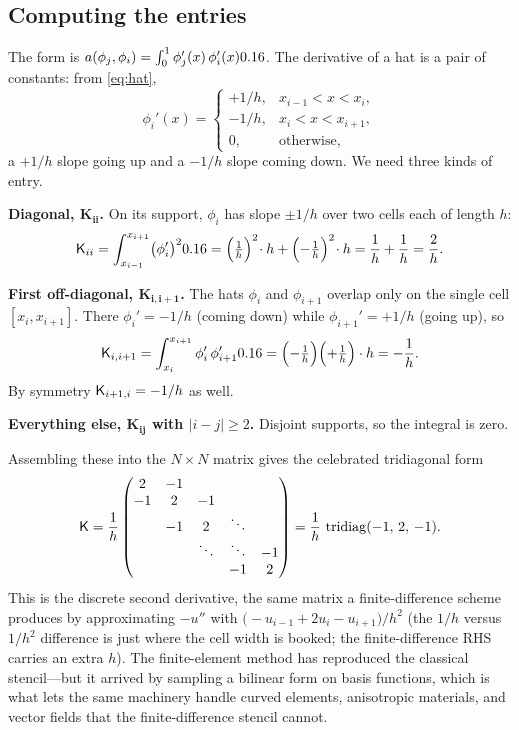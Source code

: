 \subsection{Computing the entries}

The form is $a(\phi_j,\phi_i)=\int_0^1\phi_j'(x)\,\phi_i'(x)0.16$. The derivative
of a hat is a pair of constants: from \cref{eq:hat},
\[
\phi_i'(x)=
\begin{cases}
+1/h, & x_{i-1}<x<x_i,\\
-1/h, & x_i<x<x_{i+1},\\
0, & \text{otherwise,}
\end{cases}
\]
a $+1/h$ slope going up and a $-1/h$ slope coming down. We need three kinds of
entry.

\medskip
\noindent\textbf{Diagonal, $\mathbf{K_{ii}}$.} On its support, $\phi_i$ has slope
$\pm1/h$ over two cells each of length $h$:
\[
\mathsf{K}_{ii}=\int_{x_{i-1}}^{x_{i+1}}\bigl(\phi_i'\bigr)^20.16
=\Bigl(\tfrac1h\Bigr)^2\!\cdot h+\Bigl(-\tfrac1h\Bigr)^2\!\cdot h
=\frac1h+\frac1h=\frac2h.
\]

\noindent\textbf{First off-diagonal, $\mathbf{K_{i,i+1}}$.} The hats $\phi_i$ and
$\phi_{i+1}$ overlap only on the single cell $[x_i,x_{i+1}]$. There
$\phi_i'=-1/h$ (coming down) while $\phi_{i+1}'=+1/h$ (going up), so
\[
\mathsf{K}_{i,i+1}=\int_{x_i}^{x_{i+1}}\phi_i'\,\phi_{i+1}'0.16
=\Bigl(-\tfrac1h\Bigr)\Bigl(+\tfrac1h\Bigr)\cdot h=-\frac1h.
\]
By symmetry $\mathsf{K}_{i+1,i}=-1/h$ as well.

\medskip
\noindent\textbf{Everything else, $\mathbf{K_{ij}}$ with $|i-j|\ge2$.} Disjoint
supports, so the integral is zero.

\medskip
Assembling these into the $N\times N$ matrix gives the celebrated tridiagonal
form
\begin{equation}
\mathsf{K}=\frac1h
\begin{pmatrix}
2 & -1 & & & \\
-1 & 2 & -1 & & \\
 & -1 & 2 & \ddots & \\
 & & \ddots & \ddots & -1\\
 & & & -1 & 2
\end{pmatrix}
=\frac1h\,\operatorname{tridiag}(-1,\,2,\,-1).
\label{eq:tridiag}
\end{equation}
This is the discrete second derivative, the same matrix a finite-difference
scheme produces by approximating $-u''$ with
$\bigl(-u_{i-1}+2u_i-u_{i+1}\bigr)/h^2$ (the $1/h$ versus $1/h^2$ difference is
just where the cell width is booked; the finite-difference RHS carries an extra
$h$). The finite-element method has reproduced the classical stencil---but it
arrived by sampling a bilinear form on basis functions, which is what lets the
same machinery handle curved elements, anisotropic materials, and vector fields
that the finite-difference stencil cannot.

